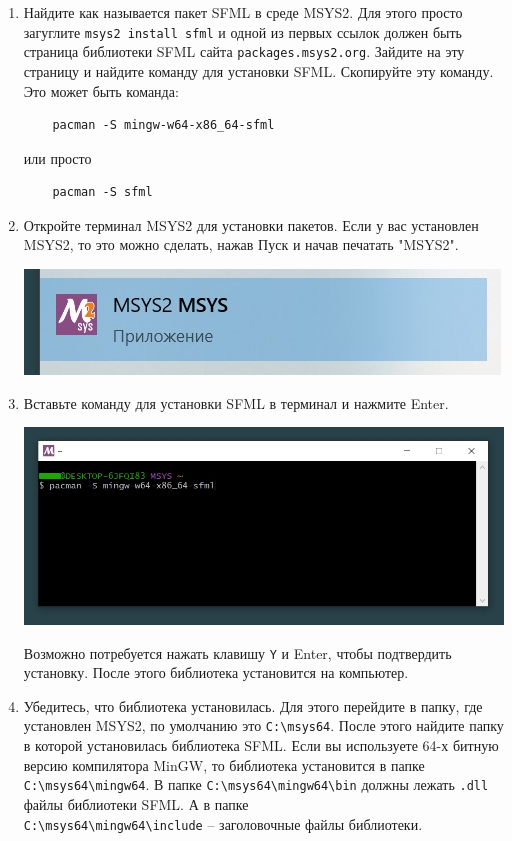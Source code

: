 \documentclass{article}
\begin{document}
\begin{enumerate}
\item Найдите как называется пакет SFML в среде MSYS2. Для этого просто загуглите \texttt{msys2 install sfml} и одной из первых ссылок должен быть страница библиотеки SFML сайта \texttt{packages.msys2.org}. Зайдите на эту страницу и найдите команду для установки SFML. Скопируйте эту команду. Это может быть команда:
\begin{verbatim}
    pacman -S mingw-w64-x86_64-sfml
\end{verbatim}
или просто
\begin{verbatim}
    pacman -S sfml
\end{verbatim}
\item Откройте терминал MSYS2 для установки пакетов. Если у вас установлен MSYS2, то это можно сделать, нажав Пуск и начав печатать "MSYS2". 
\begin{center}
\includegraphics[scale=0.9]{../images/msys2_start.jpg}
\end{center}

\item Вставьте команду для установки SFML в терминал и нажмите Enter. 
\begin{center}
\includegraphics[scale=0.9]{../images/msys2_console.jpg}
\end{center}
Возможно потребуется нажать клавишу \texttt{Y} и Enter, чтобы подтвердить установку. После этого библиотека установится на компьютер. 

\item Убедитесь, что библиотека установилась. Для этого перейдите в папку, где установлен MSYS2, по умолчанию это \texttt{C:\textbackslash msys64}. После этого найдите папку в которой установилась библиотека SFML. Если вы используете 64-х битную версию компилятора MinGW, то библиотека установится в папке \texttt{C:\textbackslash msys64\textbackslash mingw64}. В папке \texttt{C:\textbackslash msys64\textbackslash mingw64\textbackslash bin} должны лежать \texttt{.dll} файлы библиотеки SFML. А в папке \\ \texttt{C:\textbackslash msys64\textbackslash mingw64\textbackslash include} -- заголовочные файлы библиотеки.


\end{enumerate}
\end{document}
